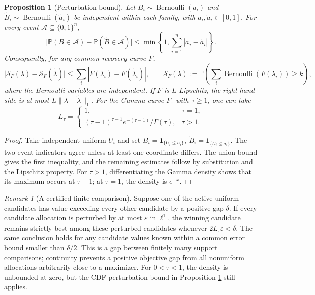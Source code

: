 \documentclass[11pt]{article}
\newtheorem{proposition}[theorem]{Proposition}
\theoremstyle{definition}
\theoremstyle{remark}
\newtheorem{remark}[theorem]{Remark}
\DeclareMathOperator{\Bernoulli}{Bernoulli}
\newcommand{\Pbb}{\mathbb P}
\newcommand{\1}{\mathbf 1}
\begin{document}
\begin{proposition}[Perturbation bound]
\label{prop:recovery-perturbation}
Let \(B_i\sim\Bernoulli(a_i)\) and
\(\widetilde B_i\sim\Bernoulli(\widetilde a_i)\) be independent
within each family, with \(a_i,\widetilde a_i\in[0,1]\).  For
every event \(\mathcal A\subseteq\{0,1\}^n\),
\[
 \bigl|\Pbb(B\in\mathcal A)
       -\Pbb(\widetilde B\in\mathcal A)\bigr|
 \le \min\left\{1,\sum_{i=1}^n|a_i-\widetilde a_i|\right\}.
\]
Consequently, for any common recovery curve \(F\),
\[
 \bigl|\mathcal S_F(\lambda)-\mathcal S_F(\widetilde\lambda)\bigr|
 \le \sum_i|F(\lambda_i)-F(\widetilde\lambda_i)|,
 \qquad
 \mathcal S_F(\lambda)
 :=\Pbb\!\left(\sum_i\Bernoulli(F(\lambda_i))\ge k\right),
\]
where the Bernoulli variables are independent.  If \(F\) is
\(L\)-Lipschitz, the right-hand side is at most
\(L\|\lambda-\widetilde\lambda\|_1\).  For the Gamma curve
\(F_\tau\) with \(\tau\ge1\), one can take
\[
 L_\tau=
 \begin{cases}
  1,&\tau=1,\\[2pt]
  (\tau-1)^{\tau-1}e^{-(\tau-1)}/\Gamma(\tau),&\tau>1.
 \end{cases}
\]
\end{proposition}

\begin{proof}
Take independent uniform \(U_i\) and set
\(B_i=\1_{\{U_i\le a_i\}}\),
\(\widetilde B_i=\1_{\{U_i\le\widetilde a_i\}}\).
The two event indicators agree unless at least one coordinate
differs.  The union bound gives the first inequality, and the
remaining estimates follow by substitution and the Lipschitz
property.  For \(\tau>1\), differentiating the Gamma density
shows that its maximum occurs at \(\tau-1\); at \(\tau=1\),
the density is \(e^{-x}\).
\end{proof}

\begin{remark}[A certified finite comparison]
Suppose one of the active-uniform candidates has value exceeding
every other candidate by a positive gap \(\delta\).  If every
candidate allocation is perturbed by at most \(\varepsilon\) in
\(\ell^1\), the winning candidate remains strictly best among
these perturbed candidates whenever
\(2L_\tau\varepsilon<\delta\).  The same conclusion holds for
any candidate values known within a common error bound smaller
than \(\delta/2\).  This is a gap between finitely many support
comparisons; continuity prevents a positive objective gap from
all nonuniform allocations arbitrarily close to a maximizer.
For \(0<\tau<1\), the density is unbounded at zero, but the
CDF perturbation bound in Proposition
\ref{prop:recovery-perturbation} still applies.
\end{remark}
\end{document}
